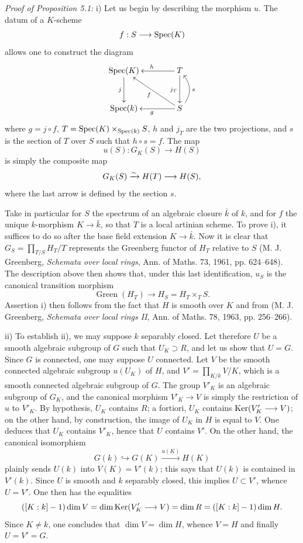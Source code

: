 \par\noindent\emph{Proof of Proposition 5.1:}
i) Let us begin by describing the morphism $u$. The datum of a $K$-scheme
\[
f:S\longrightarrow\operatorname{Spec}(K)
\]
allows one to construct the diagram
\[
\xymatrix@C=4em@R=3em{\Spec(K)\ar[d]_j&T\ar[l]_h\ar[d]_{j_T}\\\Spec(k)&S\ar[l]^g\ar[ul]^f\ar@/_1pc/[u]_s}
\]
where $g=j\circ f$, $T=\operatorname{Spec}(K)\times_{\operatorname{Spec}(k)}S$, $h$ and $j_T$ are the two projections, and $s$ is the section of $T$ over $S$ such that $h\circ s=f$. The map
\[
u(S):G_K(S)\longrightarrow H(S)
\]
is simply the composite map
\[
G_K(S)\xrightarrow{\sim} H(T)\longrightarrow H(S),
\]
where the last arrow is defined by the section $s$.

Take in particular for $S$ the spectrum of an algebraic closure $\bar k$ of $k$, and for $f$ the unique $k$-morphism $K\to\bar k$, so that $T$ is a local artinian scheme. To prove i), it suffices to do so after the base field extension $K\to\bar k$. Now it is clear that $G_S=\prod_{T/S}H_T/T$ represents the Greenberg functor of $H_T$ relative to $S$ (M. J. Greenberg, \emph{Schemata over local rings}, Ann. of Maths. 73, 1961, pp. 624--648). The description above then shows that, under this last identification, $u_S$ is the canonical transition morphism
\[
\operatorname{Green}(H_T)\longrightarrow H_S=H_T\times_T S.
\]
Assertion i) then follows from the fact that $H$ is smooth over $K$ and from (M. J. Greenberg, \emph{Schemata over local rings II}, Ann. of Maths. 78, 1963, pp. 256--266).

ii) To establish ii), we may suppose $k$ separably closed. Let therefore $U$ be a smooth algebraic subgroup of $G$ such that $U_K\supset R$, and let us show that $U=G$. Since $G$ is connected, one may suppose $U$ connected. Let $V$ be the smooth connected algebraic subgroup $u(U_K)$ of $H$, and $V'=\prod_{K/k}V/K$, which is a smooth connected algebraic subgroup of $G$. The group $V'_K$ is an algebraic subgroup of $G_K$, and the canonical morphism $V'_K\to V$ is simply the restriction of $u$ to $V'_K$. By hypothesis, $U_K$ contains $R$; a fortiori, $U_K$ contains $\operatorname{Ker}(V'_K\longrightarrow V)$; on the other hand, by construction, the image of $U_K$ in $H$ is equal to $V$. One deduces that $U_K$ contains $V'_K$, hence that $U$ contains $V'$. On the other hand, the canonical isomorphism
\[
G(k)\hookrightarrow G(K)\xrightarrow{u(K)}H(K)
\]
plainly sends $U(k)$ into $V(K)=V'(k)$; this says that $U(k)$ is contained in $V'(k)$. Since $U$ is smooth and $k$ separably closed, this implies $U\subset V'$, whence $U=V'$. One then has the equalities
\[
([K:k]-1)\dim V=\dim\operatorname{Ker}(V'_K\longrightarrow V)=\dim R=([K:k]-1)\dim H.
\]
Since $K\ne k$, one concludes that $\dim V=\dim H$, whence $V=H$ and finally $U=V'=G$.
